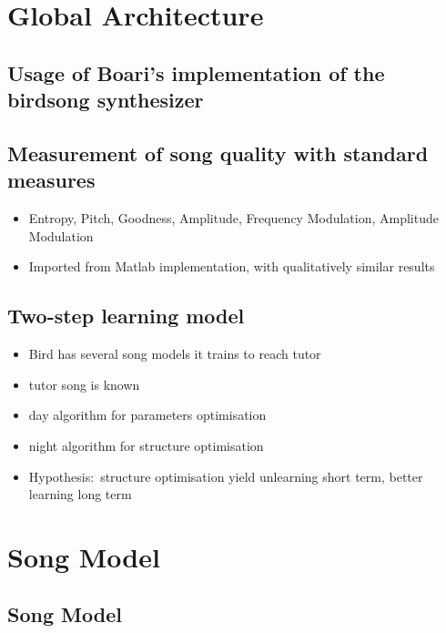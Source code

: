\section{Global Architecture}\label{global-architecture}

\subsection{Usage of Boari's implementation of the birdsong
synthesizer}\label{usage-of-boaris-implementation-of-the-birdsong-synthesizer}

\subsection{Measurement of song quality with standard
measures}\label{measurement-of-song-quality-with-standard-measures}

\begin{itemize}
\tightlist
\item
  Entropy, Pitch, Goodness, Amplitude, Frequency Modulation, Amplitude
  Modulation
\item
  Imported from Matlab implementation, with qualitatively similar
  results
\end{itemize}

\subsection{Two-step learning model}\label{two-step-learning-model}

\begin{itemize}
\tightlist
\item
  Bird has several song models it trains to reach tutor
\item
  tutor song is known
\item
  day algorithm for parameters optimisation
\item
  night algorithm for structure optimisation
\item
  Hypothesis:~structure optimisation yield unlearning short term, better
  learning long term
\end{itemize}

\section{Song Model}\label{song-model}

\subsection{Song Model}\label{song-model-1}

